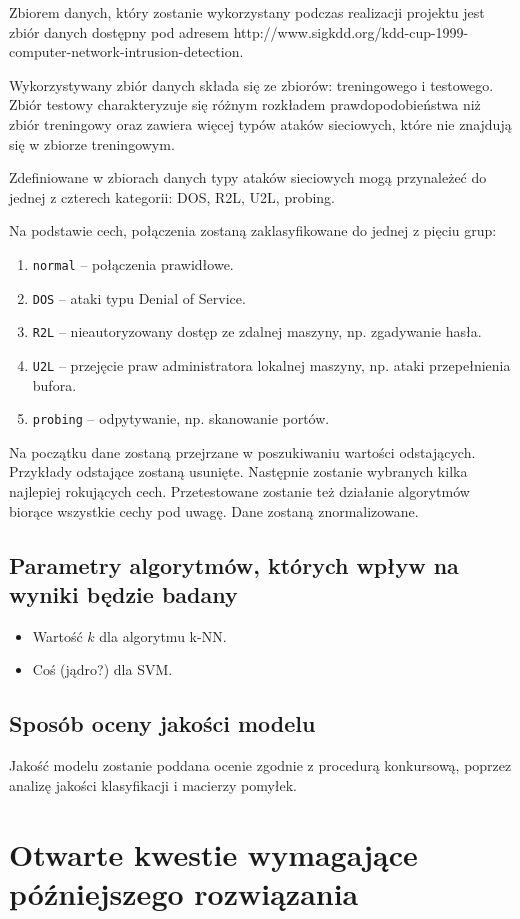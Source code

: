 \documentclass[a4paper, 12pt]{article}
\begin{document}
Zbiorem danych, który zostanie wykorzystany podczas realizacji projektu jest zbiór danych dostępny 
pod adresem http://www.sigkdd.org/kdd-cup-1999-computer-network-intrusion-detection.

Wykorzystywany zbiór danych składa się ze zbiorów: treningowego i testowego. 
Zbiór testowy charakteryzuje się różnym rozkładem prawdopodobieństwa niż zbiór treningowy oraz 
zawiera więcej typów ataków sieciowych, które nie znajdują się w zbiorze treningowym.

Zdefiniowane w zbiorach danych typy ataków sieciowych mogą przynależeć do jednej z czterech kategorii: 
DOS, R2L, U2L, probing.

Na podstawie cech, połączenia zostaną zaklasyfikowane do jednej z pięciu grup:

\begin{enumerate}
 \item \texttt{normal} -- połączenia prawidłowe.
 \item \texttt{DOS} -- ataki typu Denial of Service.
 \item \texttt{R2L} -- nieautoryzowany dostęp ze zdalnej maszyny, np. zgadywanie hasła.
 \item \texttt{U2L} -- przejęcie praw administratora lokalnej maszyny, np. ataki przepełnienia bufora.
 \item \texttt{probing} -- odpytywanie, np. skanowanie portów.
\end{enumerate}

Na początku dane zostaną przejrzane w poszukiwaniu wartości odstających.
Przykłady odstające zostaną usunięte. Następnie zostanie wybranych kilka najlepiej rokujących
cech. Przetestowane zostanie też działanie algorytmów biorące wszystkie cechy pod uwagę.
Dane zostaną znormalizowane.

\subsection{Parametry algorytmów, których wpływ na wyniki będzie badany}

\begin{itemize}
 \item Wartość $k$ dla algorytmu k-NN.
 \item Coś (jądro?) dla SVM.
\end{itemize}

\subsection{Sposób oceny jakości modelu}
Jakość modelu zostanie poddana ocenie zgodnie z procedurą konkursową,
poprzez analizę jakości klasyfikacji i macierzy pomyłek.


\section{Otwarte kwestie wymagające późniejszego rozwiązania}
\end{document}
